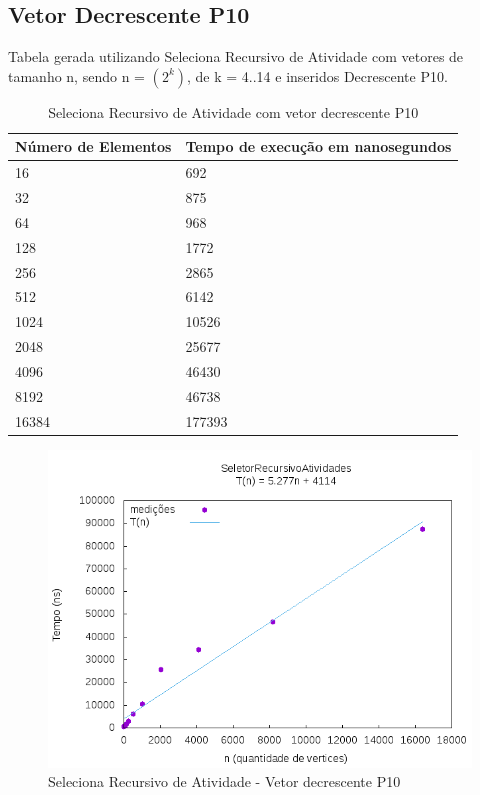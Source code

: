 \documentclass[12pt,a4paper,twoside]{report}
\begin{document}
\subsection{Vetor Decrescente P10}
Tabela gerada utilizando Seleciona Recursivo de Atividade com vetores de tamanho n, sendo n = $(2^k)$, de k = 4..14 e inseridos Decrescente P10.
\begin{table}[H]
\centering
\caption{Seleciona Recursivo de Atividade com vetor decrescente P10}
\label{my-label}
\begin{tabular}{|l|l|}
\hline
\multicolumn{1}{|c|}{\textbf{Número de Elementos}} & \multicolumn{1}{c|}{\textbf{Tempo de execução em nanosegundos}} \\ \hline
16 & 692 \\ \hline
32 & 875 \\ \hline
64 & 968 \\ \hline
128 & 1772 \\ \hline
256 & 2865 \\ \hline
512 & 6142 \\ \hline
1024 & 10526 \\ \hline
2048 & 25677 \\ \hline
4096 & 46430 \\ \hline
8192 & 46738 \\ \hline
16384 & 177393 \\ \hline

\end{tabular}
\end{table}

\begin{figure}[H]
    \centering
    \includegraphics[width=0.7\linewidth]{graficos/SeletorRecursivoAtividades/Decrescente P10/SelecionaAleatorizado.png}
  \caption{Seleciona Recursivo de Atividade - Vetor decrescente P10}
\end{figure}
\end{document}
